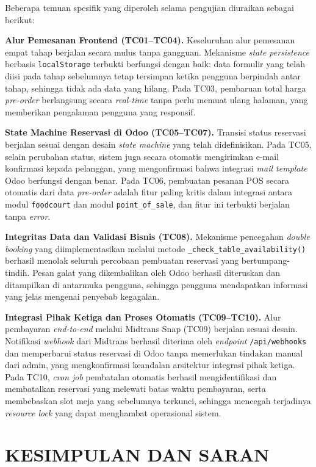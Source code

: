 \documentclass[conference]{IEEEtran}
\begin{document}
Beberapa temuan spesifik yang diperoleh selama pengujian diuraikan sebagai berikut:

\textbf{Alur Pemesanan Frontend (TC01–TC04).}
Keseluruhan alur pemesanan empat tahap berjalan secara mulus tanpa gangguan. Mekanisme \textit{state persistence} berbasis \texttt{localStorage} terbukti berfungsi dengan baik: data formulir yang telah diisi pada tahap sebelumnya tetap tersimpan ketika pengguna berpindah antar tahap, sehingga tidak ada data yang hilang. Pada TC03, pembaruan total harga \textit{pre-order} berlangsung secara \textit{real-time} tanpa perlu memuat ulang halaman, yang memberikan pengalaman pengguna yang responsif.

\textbf{State Machine Reservasi di Odoo (TC05–TC07).}
Transisi status reservasi berjalan sesuai dengan desain \textit{state machine} yang telah didefinisikan. Pada TC05, selain perubahan status, sistem juga secara otomatis mengirimkan e-mail konfirmasi kepada pelanggan, yang mengonfirmasi bahwa integrasi \textit{mail template} Odoo berfungsi dengan benar. Pada TC06, pembuatan pesanan POS secara otomatis dari data \textit{pre-order} adalah fitur paling kritis dalam integrasi antara modul \texttt{foodcourt} dan modul \texttt{point\_of\_sale}, dan fitur ini terbukti berjalan tanpa \textit{error}.

\textbf{Integritas Data dan Validasi Bisnis (TC08).}
Mekanisme pencegahan \textit{double booking} yang diimplementasikan melalui metode \texttt{\_check\_table\_availability()} berhasil menolak seluruh percobaan pembuatan reservasi yang bertumpang-tindih. Pesan galat yang dikembalikan oleh Odoo berhasil diteruskan dan ditampilkan di antarmuka pengguna, sehingga pengguna mendapatkan informasi yang jelas mengenai penyebab kegagalan.

\textbf{Integrasi Pihak Ketiga dan Proses Otomatis (TC09–TC10).}
Alur pembayaran \textit{end-to-end} melalui Midtrans Snap (TC09) berjalan sesuai desain. Notifikasi \textit{webhook} dari Midtrans berhasil diterima oleh \textit{endpoint} \texttt{/api/webhooks} dan memperbarui status reservasi di Odoo tanpa memerlukan tindakan manual dari admin, yang mengkonfirmasi keandalan arsitektur integrasi pihak ketiga. Pada TC10, \textit{cron job} pembatalan otomatis berhasil mengidentifikasi dan membatalkan reservasi yang melewati batas waktu pembayaran, serta membebaskan slot meja yang sebelumnya terkunci, sehingga mencegah terjadinya \textit{resource lock} yang dapat menghambat operasional sistem.

\section{KESIMPULAN DAN SARAN}
\end{document}
